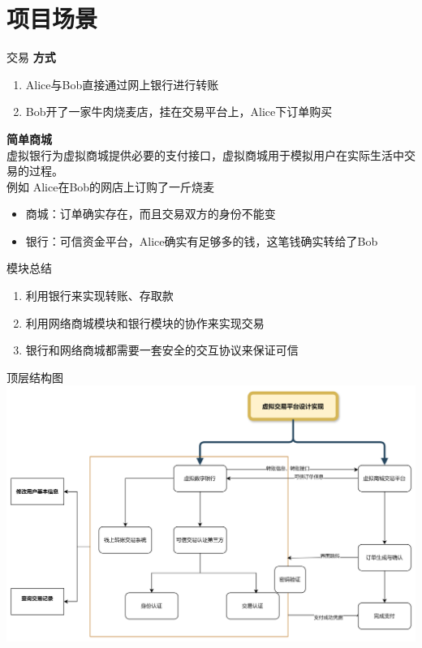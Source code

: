 \documentclass[]{beamer}
\begin{document}
    \section{项目场景}
    \begin{frame}{交易}
        \textbf{方式}
        \begin{enumerate}
            \item Alice与Bob直接通过网上银行进行转账
            \item Bob开了一家牛肉烧麦店，挂在交易平台上，Alice下订单购买
        \end{enumerate}
        \textbf{简单商城} \\[2ex]

        虚拟银行为虚拟商城提供必要的支付接口，虚拟商城用于模拟用户在实际生活中交易的过程。\\[2ex]

        例如 Alice在Bob的网店上订购了一斤烧麦\\[2ex]

        \begin{itemize}
            \item 商城：订单确实存在，而且交易双方的身份不能变
            \item 银行：可信资金平台，Alice确实有足够多的钱，这笔钱确实转给了Bob
        \end{itemize}
    \end{frame}

    \begin{frame}{模块总结}
        \begin{enumerate}
            \item 利用银行来实现转账、存取款
            \item 利用网络商城模块和银行模块的协作来实现交易
            \item 银行和网络商城都需要一套安全的交互协议来保证可信
        \end{enumerate}
    \end{frame}

    \begin{frame}{顶层结构图}
        \includegraphics[width=1\textwidth]{module.png}
    \end{frame}
    
\end{document}
